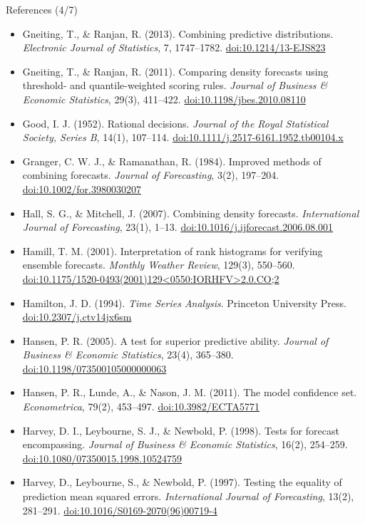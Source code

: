 \begin{frame}{References (4/7)}
\itemsize{\tiny}
\begin{itemize}
    \item Gneiting, T., \& Ranjan, R. (2013). Combining predictive distributions. \textit{Electronic Journal of Statistics}, 7, 1747--1782. \href{https://doi.org/10.1214/13-EJS823}{doi:10.1214/13-EJS823}
    \item Gneiting, T., \& Ranjan, R. (2011). Comparing density forecasts using threshold- and quantile-weighted scoring rules. \textit{Journal of Business \& Economic Statistics}, 29(3), 411--422. \href{https://doi.org/10.1198/jbes.2010.08110}{doi:10.1198/jbes.2010.08110}
    \item Good, I. J. (1952). Rational decisions. \textit{Journal of the Royal Statistical Society, Series B}, 14(1), 107--114. \href{https://doi.org/10.1111/j.2517-6161.1952.tb00104.x}{doi:10.1111/j.2517-6161.1952.tb00104.x}
    \item Granger, C. W. J., \& Ramanathan, R. (1984). Improved methods of combining forecasts. \textit{Journal of Forecasting}, 3(2), 197--204. \href{https://doi.org/10.1002/for.3980030207}{doi:10.1002/for.3980030207}
    \item Hall, S. G., \& Mitchell, J. (2007). Combining density forecasts. \textit{International Journal of Forecasting}, 23(1), 1--13. \href{https://doi.org/10.1016/j.ijforecast.2006.08.001}{doi:10.1016/j.ijforecast.2006.08.001}
    \item Hamill, T. M. (2001). Interpretation of rank histograms for verifying ensemble forecasts. \textit{Monthly Weather Review}, 129(3), 550--560. \href{https://doi.org/10.1175/1520-0493(2001)129\%3C0550:IORHFV\%3E2.0.CO;2}{doi:10.1175/1520-0493(2001)129\textless{}0550:IORHFV\textgreater{}2.0.CO;2}
    \item Hamilton, J. D. (1994). \textit{Time Series Analysis}. Princeton University Press. \href{https://doi.org/10.2307/j.ctv14jx6sm}{doi:10.2307/j.ctv14jx6sm}
    \item Hansen, P. R. (2005). A test for superior predictive ability. \textit{Journal of Business \& Economic Statistics}, 23(4), 365--380. \href{https://doi.org/10.1198/073500105000000063}{doi:10.1198/073500105000000063}
    \item Hansen, P. R., Lunde, A., \& Nason, J. M. (2011). The model confidence set. \textit{Econometrica}, 79(2), 453--497. \href{https://doi.org/10.3982/ECTA5771}{doi:10.3982/ECTA5771}
    \item Harvey, D. I., Leybourne, S. J., \& Newbold, P. (1998). Tests for forecast encompassing. \textit{Journal of Business \& Economic Statistics}, 16(2), 254--259. \href{https://doi.org/10.1080/07350015.1998.10524759}{doi:10.1080/07350015.1998.10524759}
    \item Harvey, D., Leybourne, S., \& Newbold, P. (1997). Testing the equality of prediction mean squared errors. \textit{International Journal of Forecasting}, 13(2), 281--291. \href{https://doi.org/10.1016/S0169-2070(96)00719-4}{doi:10.1016/S0169-2070(96)00719-4}
\end{itemize}
\end{frame}

